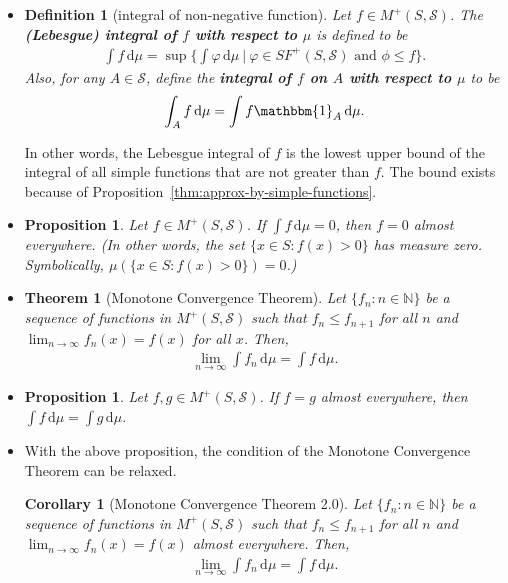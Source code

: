 \documentclass[10pt]{article}
\newtheorem{theorem}[lemma]{Theorem}
\newtheorem{definition}[lemma]{Definition}
\newtheorem{proposition}[lemma]{Proposition}
\newtheorem{corollary}[lemma]{Corollary}
\numberwithin{lemma}{section}
\newcommand{\dee}{\mathrm{d}}
\newcommand{\mcal}[1]{\mathcal{#1}}
\newcommand{\Nat}{\mathbb{N}}
\newcommand{\one}{\mathbbm{1}}
\begin{document}
\begin{itemize}
  \item \begin{definition}[integral of non-negative function]
    Let $f \in M^+(S,\mcal{S})$. The {\bf (Lebesgue) integral of $f$ with respect to $\mu$} is defined to be
    \begin{align*}
      \int f\, \dee\mu = \sup \bigg\{ \int \varphi\, \dee \mu \ \bigg|\  \varphi \in SF^+(S,\mcal{S}) \mbox{ and } \phi \leq f \bigg\}.
    \end{align*}
    Also, for any $A \in \mcal{S}$, define the {\bf integral of $f$ on $A$ with respect to $\mu$} to be
    \begin{align*}
      \int_A f\, \dee\mu = \int f\one_A\, \dee\mu.
    \end{align*}
  \end{definition}
  In other words, the Lebesgue integral of $f$ is the lowest upper bound of the integral of all simple functions that are not greater than $f$. The bound exists because of Proposition~\ref{thm:approx-by-simple-functions}.

  \item \begin{proposition}
    Let $f \in M^+(S,\mcal{S})$. If $\int f\, \dee\mu = 0$, then $f = 0$ almost everywhere. (In other words, the set $\{ x\in S : f(x) > 0 \}$ has measure zero. Symbolically, $\mu(\{ x \in S : f(x) > 0\}) = 0$.)
  \end{proposition}

  \item \begin{theorem}[Monotone Convergence Theorem]
    Let $\{ f_n : n \in \Nat \}$ be a sequence of functions in $M^+(S,\mcal{S})$ such that $f_n \leq f_{n+1}$ for all $n$ and $\lim_{n 
    \rightarrow \infty} f_n(x) = f(x)$ for all $x$. Then,
    \begin{align*}
      \lim_{n \rightarrow \infty} \int f_n\, \dee\mu = \int f\, \dee\mu.
    \end{align*}
  \end{theorem}

  \item \begin{proposition}
    Let $f,g \in M^+(S,\mcal{S})$. If $f = g$ almost everywhere, then $\int f\, \dee\mu = \int g\, \dee\mu$.
  \end{proposition}

  \item With the above proposition, the condition of the Monotone Convergence Theorem can be relaxed. 
  \begin{corollary}[Monotone Convergence Theorem 2.0]
    Let $\{ f_n : n \in \Nat \}$ be a sequence of functions in $M^+(S,\mcal{S})$ such that $f_n \leq f_{n+1}$ for all $n$ and $\lim_{n 
    \rightarrow \infty} f_n(x) = f(x)$ almost everywhere. Then,
    \begin{align*}
      \lim_{n \rightarrow \infty} \int f_n\, \dee\mu = \int f\, \dee\mu.
    \end{align*}
  \end{corollary}


\end{itemize}
\end{document}
